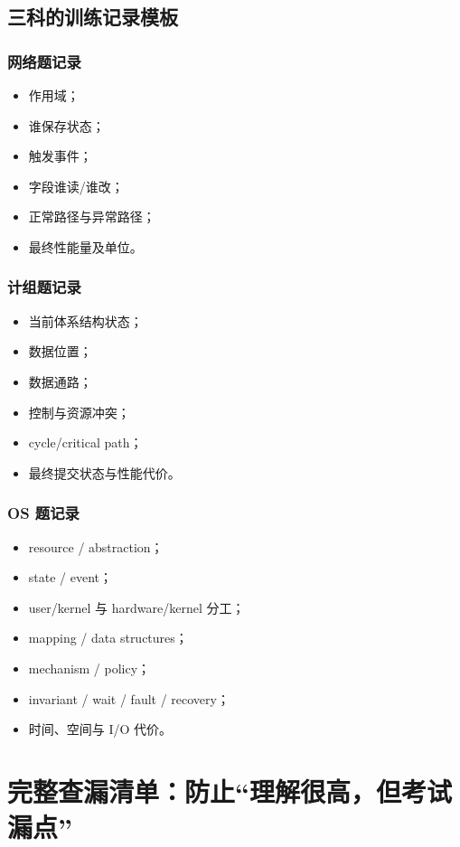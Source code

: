 \documentclass[11pt,a4paper,openany]{ctexbook}
\begin{document}
\section{三科的训练记录模板}

\subsection{网络题记录}
\begin{itemize}
  \item 作用域；
  \item 谁保存状态；
  \item 触发事件；
  \item 字段谁读/谁改；
  \item 正常路径与异常路径；
  \item 最终性能量及单位。
\end{itemize}

\subsection{计组题记录}
\begin{itemize}
  \item 当前体系结构状态；
  \item 数据位置；
  \item 数据通路；
  \item 控制与资源冲突；
  \item cycle/critical path；
  \item 最终提交状态与性能代价。
\end{itemize}

\subsection{OS 题记录}
\begin{itemize}
  \item resource / abstraction；
  \item state / event；
  \item user/kernel 与 hardware/kernel 分工；
  \item mapping / data structures；
  \item mechanism / policy；
  \item invariant / wait / fault / recovery；
  \item 时间、空间与 I/O 代价。
\end{itemize}

\chapter{完整查漏清单：防止“理解很高，但考试漏点”}
\end{document}
